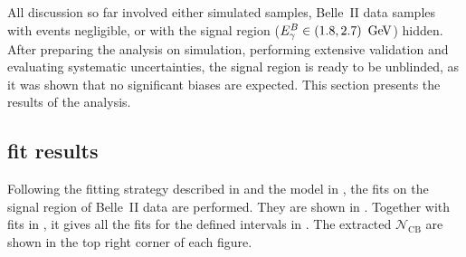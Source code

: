 All discussion so far involved either simulated samples, Belle~II data samples with \BtoXsgamma events negligible,
or with the signal region (${E^B_{\gamma}}\in(1.8,2.7)~\mathrm{\,Ge\kern -0.1em V}$) hidden.
After preparing the analysis on simulation, performing extensive validation and evaluating systematic uncertainties, 
the signal region is ready to be unblinded, as it was shown that no significant biases are expected.
This section presents the results of the analysis.

\subsection{\texorpdfstring{\Mbc}{Mbc} fit results}\label{sec:mbc_fit_results}

Following the \Mbc fitting strategy described in  and the model in ,
the fits on the signal region of Belle~II data are performed.
They are shown in .
Together with fits in , it gives all the fits for the defined \EB intervals in .
The extracted $\mathcal{N}_{\mathrm{CB}}$ are shown in the top right corner of each figure.
